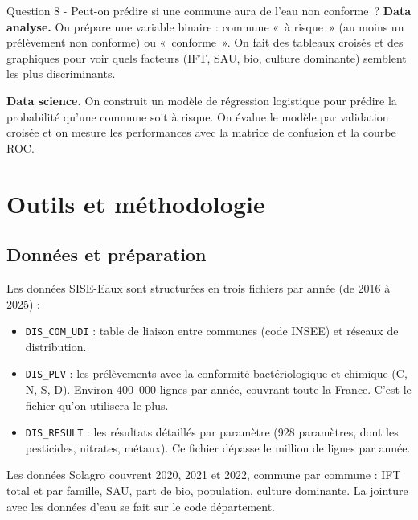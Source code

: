 \documentclass[a4paper,11pt]{article}
\begin{document}
\begin{questionbox}{Question 8 - Peut-on prédire si une commune aura de l'eau non conforme~?}
\textbf{Data analyse.} On prépare une variable binaire : commune «~à risque~» (au moins un prélèvement non conforme) ou «~conforme~». On fait des tableaux croisés et des graphiques pour voir quels facteurs (IFT, SAU, bio, culture dominante) semblent les plus discriminants.\par\smallskip
\textbf{Data science.} On construit un modèle de régression logistique pour prédire la probabilité qu'une commune soit à risque. On évalue le modèle par validation croisée et on mesure les performances avec la matrice de confusion et la courbe ROC.
\end{questionbox}

\section{Outils et méthodologie}

\subsection{Données et préparation}

Les données SISE-Eaux sont structurées en trois fichiers par année (de 2016 à 2025) :

\begin{itemize}[itemsep=2pt]
  \item \texttt{DIS\_COM\_UDI} : table de liaison entre communes (code INSEE) et réseaux de distribution.
  \item \texttt{DIS\_PLV} : les prélèvements avec la conformité bactériologique et chimique (C, N, S, D). Environ 400~000 lignes par année, couvrant toute la France. C'est le fichier qu'on utilisera le plus.
  \item \texttt{DIS\_RESULT} : les résultats détaillés par paramètre (928 paramètres, dont les pesticides, nitrates, métaux). Ce fichier dépasse le million de lignes par année.
\end{itemize}

Les données Solagro couvrent 2020, 2021 et 2022, commune par commune : IFT total et par famille, SAU, part de bio, population, culture dominante. La jointure avec les données d'eau se fait sur le code département.
\end{document}
